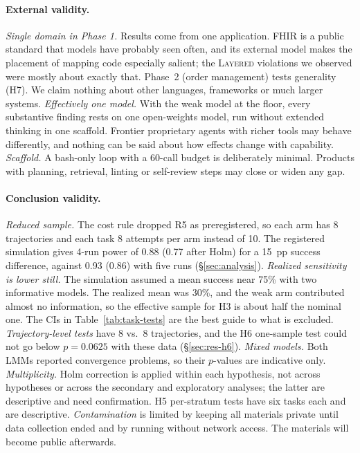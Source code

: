 \documentclass[10pt]{article}
\newcommand{\LAY}{\textsc{Layered}}
\begin{document}
\paragraph{External validity.}
\emph{Single domain in Phase 1.} Results come from one application. FHIR is a public standard that
models have probably seen often, and its external model makes the placement of mapping code
especially salient; the \LAY{} violations we observed were mostly about exactly that. Phase~2
(order management) tests generality (H7). We claim nothing about other languages, frameworks or
much larger systems. \emph{Effectively one model.} With the weak model at the floor, every
substantive finding rests on one open-weights model, run without extended thinking in one scaffold.
Frontier proprietary agents with richer tools may behave differently, and nothing can be said about
how effects change with capability. \emph{Scaffold.} A bash-only loop with a 60-call budget is
deliberately minimal. Products with planning, retrieval, linting or self-review steps may close or
widen any gap.

\paragraph{Conclusion validity.}
\emph{Reduced sample.} The cost rule dropped R5 as preregistered, so each arm has 8 trajectories and
each task 8 attempts per arm instead of 10. The registered simulation gives 4-run power of 0.88
(0.77 after Holm) for a 15~pp success difference, against 0.93 (0.86) with five runs
(\S\ref{sec:analysis}). \emph{Realized sensitivity is lower still.} The simulation assumed a mean
success near 75\% with two informative models. The realized mean was 30\%, and the weak arm
contributed almost no information, so the effective sample for H3 is about half the nominal one.
The CIs in Table~\ref{tab:task-tests} are the best guide to what is excluded. \emph{Trajectory-level
tests} have 8 vs.\ 8 trajectories, and the H6 one-sample test could not go below $p=0.0625$ with
these data (\S\ref{sec:res-h6}). \emph{Mixed models.} Both LMMs reported convergence problems, so
their $p$-values are indicative only. \emph{Multiplicity.} Holm correction is applied within each
hypothesis, not across hypotheses or across the secondary and exploratory analyses; the latter are
descriptive and need confirmation. H5 per-stratum tests have six tasks each and are descriptive.
\emph{Contamination} is limited by keeping all materials private until data collection ended and
by running without network access. The materials will become public afterwards.
\end{document}
